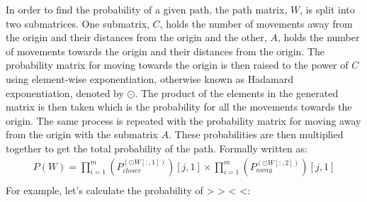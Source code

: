 \documentclass[letterpaper, 12pt]{report}
\begin{document}
In order to find the probability of a given path, the path matrix, $W$, is
split into two submatrices. One submatrix, $C$, holds the number of movements
away from the origin and their distances from the origin and the other, $A$,
holds the number of movements towards the origin and their distances from the
origin. The probability matrix for moving towards the origin is then raised to
the power of $C$ using element-wise exponentiation, otherwise known as Hadamard
exponentiation, denoted by $\odot$. The product of the elements in the
generated matrix is then taken which is the probability for all the movements
towards the origin. The same process is repeated with the probability matrix
for moving away from the origin with the submatrix $A$. These probabilities are
then multiplied together to get the total probability of the path. Formally
written as:
\begin{align*}
	P(W)=\prod_{i=1}^{m} \left(P_{closer}^{\left(\odot
		W
		[:,1]\right)} \right)
	[j, 1]
	\times
	\prod_{i=1}^{m} \left( P_{away} ^{\left(\odot
		W
		[:,2]\right)} \right)
	[j, 1]
	\\
\end{align*}
For example, let's calculate the probability of > > < <:
\end{document}
